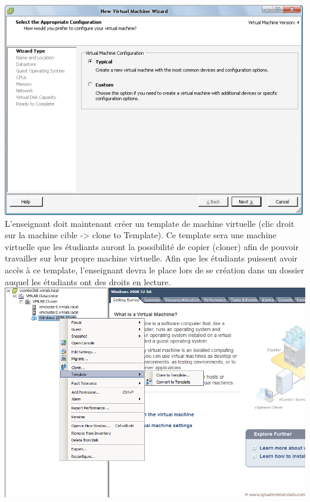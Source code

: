 \includegraphics[scale=0.73]{newVM.png}\\

L’enseignant doit maintenant créer un template de machine virtuelle (clic droit sur la machine cible -> clone to Template). Ce template sera une machine virtuelle que les étudiants auront la possibilité de copier (cloner) afin de pouvoir travailler sur leur propre machine virtuelle. Afin que les étudiants puissent avoir accès à ce template, l’enseignant devra le place lors de se création dans un dossier auquel les étudiants ont des droits en lecture.\\

\includegraphics[scale=0.3]{template1.png}\\

